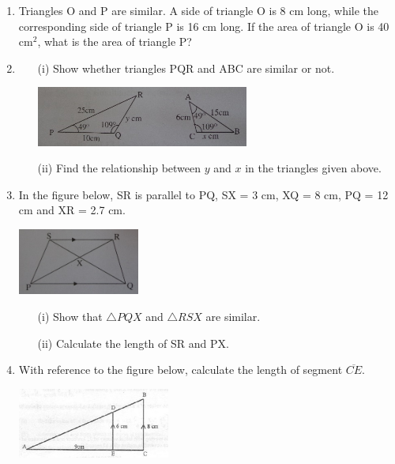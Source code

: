 \begin{enumerate}
	\item Triangles O and P are similar. A side of triangle O is 8 cm long, while the corresponding side of triangle P is 16 cm long. If the area of triangle O is 40 cm$^2$, what is the area of triangle P?
	
	\item 
		\begin{itemize}
		\item[(i)] Show whether triangles PQR and ABC are similar or not.
	\begin{center}
	\includegraphics[width=7cm]{./img/sim14.jpg}
	\end{center}
		\item[(ii)] Find the relationship between $y$ and $x$ in the triangles given above.
		\end{itemize}
		
	\item In the figure below, SR is parallel to PQ, SX = 3 cm, XQ = 8 cm, PQ = 12 cm and XR = 2.7 cm.
	\begin{center}
	\includegraphics[width=4cm]{./img/sim15.jpg}
	\end{center}
		\begin{itemize}
		\item[(i)] Show that $\bigtriangleup PQX$ and $\bigtriangleup RSX$ are similar.
		\item[(ii)] Calculate the length of SR and PX.
		\end{itemize}
	
	\item With reference to the figure below, calculate the length of segment $\overline{CE}$.
	
	\begin{center}
	\includegraphics[width=5cm]{./img/sim3.jpg}
	\end{center}


\end{enumerate}
